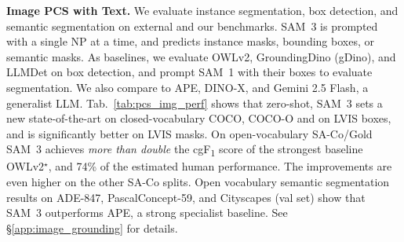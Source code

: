 \documentclass[]{fairmeta}
\newcommand{\samone}{SAM~1\xspace}
\newcommand{\model}{SAM~3\xspace}
\newcommand{\dsname}{{SA-Co}\xspace}
\newcommand{\evalgold}{{\dsname/Gold}\xspace}
\newcommand{\cgf}{cgF\textsubscript{1}\xspace}
\renewcommand{\paragraph}[1]{%
	\noindent\textbf{#1.}\noindent\xspace%
}
\begin{document}
\paragraph{Image PCS with Text} We evaluate instance segmentation, box detection, and semantic segmentation on external and our benchmarks. \model is prompted with a single NP at a time, and predicts instance masks, bounding boxes, or semantic masks. As baselines, we evaluate OWLv2, GroundingDino (gDino), and LLMDet on box detection, and prompt \samone with their boxes to evaluate segmentation. We also compare to APE, DINO-X, and Gemini 2.5 Flash, a generalist LLM. %
Tab.~\ref{tab:pcs_img_perf} shows that zero-shot, \model sets a new state-of-the-art on closed-vocabulary COCO, COCO-O and on LVIS boxes, and is significantly better on LVIS masks. On open-vocabulary \evalgold \model achieves \textit{more than double} the \cgf score of the strongest baseline OWLv2$^\star$, and 74\% of the estimated human performance. The improvements are even higher on the other \dsname splits.
Open vocabulary semantic segmentation results on ADE-847, PascalConcept-59, and Cityscapes (val set) show that \model outperforms APE, a strong specialist baseline.
See \S\ref{app:image_grounding} for details. %
\end{document}
